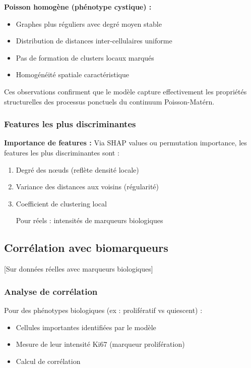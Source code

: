 \textbf{Poisson homogène (phénotype cystique) :}
\begin{itemize}
    \item Graphes plus réguliers avec degré moyen stable
    \item Distribution de distances inter-cellulaires uniforme
    \item Pas de formation de clusters locaux marqués
    \item Homogénéité spatiale caractéristique
\end{itemize}

Ces observations confirment que le modèle capture effectivement les propriétés structurelles des processus ponctuels du continuum Poisson-Matérn.

\subsubsection{Features les plus discriminantes}

\textbf{Importance de features :}
Via SHAP values ou permutation importance, les features les plus discriminantes sont :
\begin{enumerate}
    \item Degré des nœuds (reflète densité locale)
    \item Variance des distances aux voisins (régularité)
    \item Coefficient de clustering local
    \item [Pour réels : intensités de marqueurs biologiques]
\end{enumerate}

\subsection{Corrélation avec biomarqueurs}

[Sur données réelles avec marqueurs biologiques]

\subsubsection{Analyse de corrélation}

Pour des phénotypes biologiques (ex : prolifératif vs quiescent) :
\begin{itemize}
    \item Cellules importantes identifiées par le modèle
    \item Mesure de leur intensité Ki67 (marqueur prolifération)
    \item Calcul de corrélation
\end{itemize}

